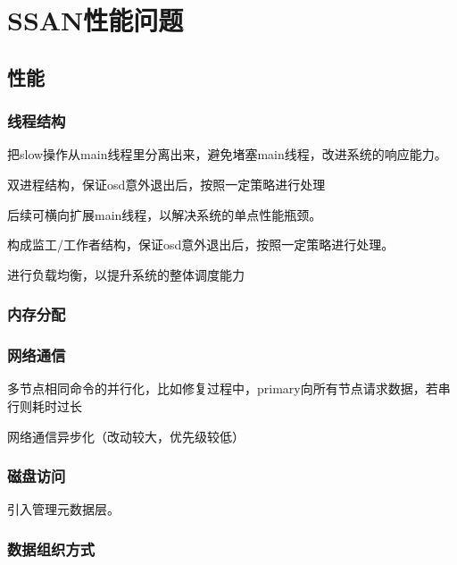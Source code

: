 \chapter{SSAN性能问题}

\section{性能}

\subsection{线程结构}

\begin{enumbox}
\item 把slow操作从main线程里分离出来，避免堵塞main线程，改进系统的响应能力。
\item 双进程结构，保证osd意外退出后，按照一定策略进行处理
\item 后续可横向扩展main线程，以解决系统的单点性能瓶颈。
\end{enumbox}

构成监工/工作者结构，保证osd意外退出后，按照一定策略进行处理。

进行负载均衡，以提升系统的整体调度能力

\subsection{内存分配}


\subsection{网络通信}

\begin{enumbox}
\item 多节点相同命令的并行化，比如修复过程中，primary向所有节点请求数据，若串行则耗时过长
\item 网络通信异步化（改动较大，优先级较低）
\end{enumbox}


\subsection{磁盘访问}

引入管理元数据层。

\subsection{数据组织方式}

